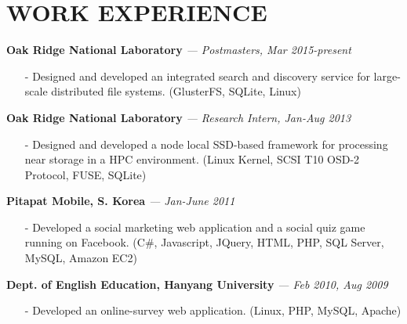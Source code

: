 \section{WORK EXPERIENCE} 
\vspace{0.03in} 
{\bf Oak Ridge National Laboratory}
{\it \footnotesize --- Postmasters, Mar 2015-present}
\begin{itemize}[leftmargin=*]
\setlength\itemsep{-0.02in}
 \item[-] Designed and developed an integrated search and discovery service for
	  large-scale distributed file systems.
          {\small(GlusterFS, SQLite, Linux)}
\end{itemize}
\vspace{-0.15in}

{\bf Oak Ridge National Laboratory}
{\it \footnotesize --- Research Intern, Jan-Aug 2013}
\begin{itemize}[leftmargin=*]
\setlength\itemsep{-0.02in}
 \item[-] Designed and developed a node local SSD-based framework for processing near
  storage in a HPC environment.
  {\small(Linux Kernel, SCSI T10 OSD-2 Protocol, FUSE, SQLite)}
\end{itemize}
\vspace{-0.15in}
{\bf Pitapat Mobile, S. Korea}
{\it \footnotesize --- Jan-June 2011}
\begin{itemize}[leftmargin=*]
\setlength\itemsep{-0.02in}
 \item[-] Developed a social marketing web application and a social quiz game running on
  Facebook.
  {\small(C\#, Javascript, JQuery, HTML, PHP, SQL Server, MySQL, Amazon EC2)}
\end{itemize}
\vspace{-0.15in}

{\bf Dept. of English Education, Hanyang University}
{\it \footnotesize --- Feb 2010, Aug 2009}
\begin{itemize}[leftmargin=*]
\setlength\itemsep{-0.02in}
 \item[-] Developed an online-survey web application.
          {\small(Linux, PHP, MySQL, Apache)}
\end{itemize}
\vspace{-0.15in}

